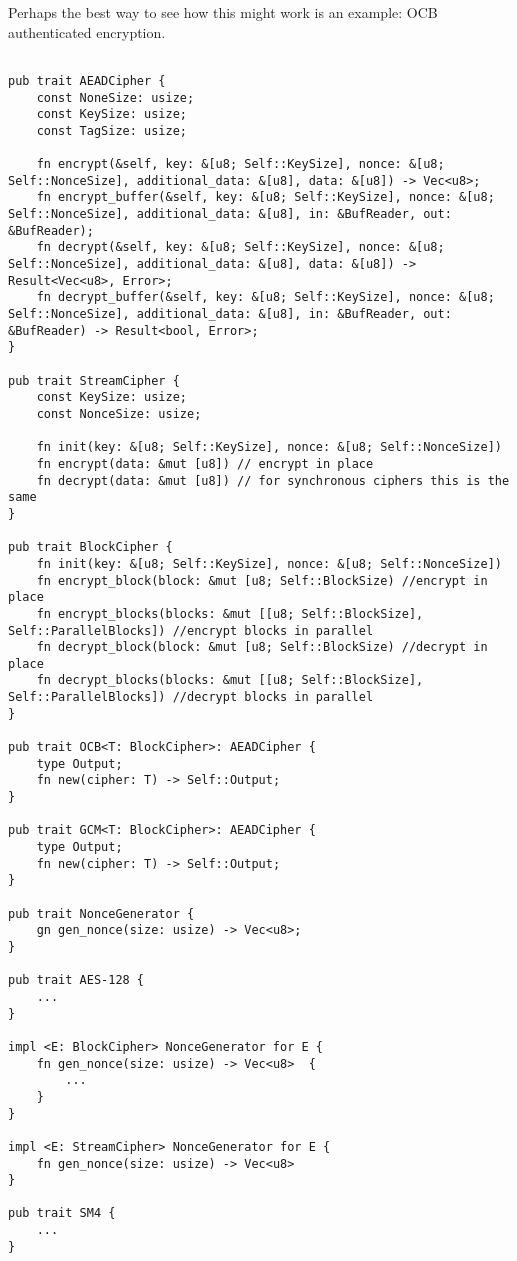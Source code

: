 Perhaps the best way to see how this might work is an example:  OCB authenticated encryption.

\begin{verbatim}

pub trait AEADCipher {
    const NoneSize: usize;
    const KeySize: usize;
    const TagSize: usize;
    
    fn encrypt(&self, key: &[u8; Self::KeySize], nonce: &[u8; Self::NonceSize], additional_data: &[u8], data: &[u8]) -> Vec<u8>;
    fn encrypt_buffer(&self, key: &[u8; Self::KeySize], nonce: &[u8; Self::NonceSize], additional_data: &[u8], in: &BufReader, out: &BufReader);
    fn decrypt(&self, key: &[u8; Self::KeySize], nonce: &[u8; Self::NonceSize], additional_data: &[u8], data: &[u8]) -> Result<Vec<u8>, Error>;
    fn decrypt_buffer(&self, key: &[u8; Self::KeySize], nonce: &[u8; Self::NonceSize], additional_data: &[u8], in: &BufReader, out: &BufReader) -> Result<bool, Error>;
}

pub trait StreamCipher {
    const KeySize: usize;
    const NonceSize: usize;

    fn init(key: &[u8; Self::KeySize], nonce: &[u8; Self::NonceSize])
    fn encrypt(data: &mut [u8]) // encrypt in place
    fn decrypt(data: &mut [u8]) // for synchronous ciphers this is the same 
}

pub trait BlockCipher {
    fn init(key: &[u8; Self::KeySize], nonce: &[u8; Self::NonceSize])
    fn encrypt_block(block: &mut [u8; Self::BlockSize) //encrypt in place
    fn encrypt_blocks(blocks: &mut [[u8; Self::BlockSize], Self::ParallelBlocks]) //encrypt blocks in parallel
    fn decrypt_block(block: &mut [u8; Self::BlockSize) //decrypt in place
    fn decrypt_blocks(blocks: &mut [[u8; Self::BlockSize], Self::ParallelBlocks]) //decrypt blocks in parallel
}

pub trait OCB<T: BlockCipher>: AEADCipher {
    type Output;
    fn new(cipher: T) -> Self::Output;
}

pub trait GCM<T: BlockCipher>: AEADCipher {
    type Output;
    fn new(cipher: T) -> Self::Output;
}

pub trait NonceGenerator {
    gn gen_nonce(size: usize) -> Vec<u8>; 
}

pub trait AES-128 {
    ...
}

impl <E: BlockCipher> NonceGenerator for E {
    fn gen_nonce(size: usize) -> Vec<u8>  {
        ...
    }
}

impl <E: StreamCipher> NonceGenerator for E {
    fn gen_nonce(size: usize) -> Vec<u8>
}

pub trait SM4 {
    ...
}

\end{verbatim}

